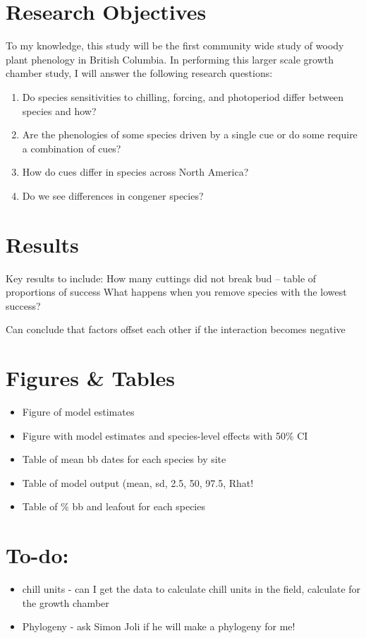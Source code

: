 \documentclass[11pt,letter]{article}
\begin{document}
\section{Research Objectives}
To my knowledge, this study will be the first community wide study of woody plant phenology in British Columbia. In performing this larger scale growth chamber study, I will answer the following research questions:
\begin{enumerate}
\item Do species sensitivities to chilling, forcing, and photoperiod differ between species and how?
\item Are the phenologies of some species driven by a single cue or do some require a combination of cues?
\item How do cues differ in species across North America? 
\item Do we see differences in congener species? 
\end{enumerate}

\section{Results}

Key results to include:
How many cuttings did not break bud -- table of proportions of success
What happens when you remove species with the lowest success?

Can conclude that factors offset each other if the interaction becomes negative



\section{Figures \& Tables}

\begin{itemize}
\item Figure of model estimates
\item Figure with model estimates and species-level effects with 50\% CI
\item Table of mean bb dates for each species by site
\item Table of model output (mean, sd, 2.5, 50, 97.5, Rhat! 
\item Table of \% bb and leafout for each species
\end{itemize}

\section{To-do:}
\begin{itemize}
\item chill units - can I get the data to calculate chill units in the field, calculate for the growth chamber
\item Phylogeny - ask Simon Joli if he will make a phylogeny for me!
\end{itemize}
\end{document}
